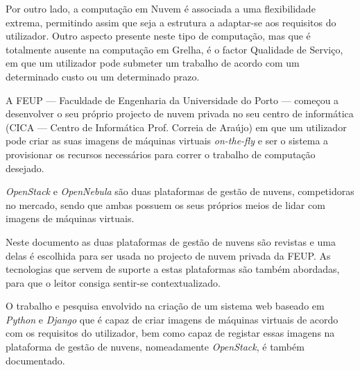 Por outro lado, a computação em Nuvem é associada a uma flexibilidade extrema, permitindo assim que seja a estrutura a adaptar-se aos requisitos do utilizador. Outro aspecto presente neste tipo de computação, mas que é totalmente ausente na computação em Grelha, é o factor Qualidade de Serviço, em que um utilizador pode submeter um trabalho de acordo com um determinado custo ou um determinado prazo.

A FEUP --- Faculdade de Engenharia da Universidade do Porto --- começou a desenvolver o seu próprio projecto de nuvem privada no seu centro de informática (CICA --- Centro de Informática Prof. Correia de Araújo) em que um utilizador pode criar as suas imagens de máquinas virtuais \textit{on-the-fly} e ser o sistema a provisionar os recursos necessários para correr o trabalho de computação desejado.

\textit{OpenStack} e \textit{OpenNebula} são duas plataformas de gestão de nuvens, competidoras no mercado, sendo que ambas possuem os seus próprios meios de lidar com imagens de máquinas virtuais.

Neste documento as duas plataformas de gestão de nuvens são revistas e uma delas é escolhida para ser usada no projecto de nuvem privada da FEUP. As tecnologias que servem de suporte a estas plataformas são também abordadas, para que o leitor consiga sentir-se contextualizado.

O trabalho e pesquisa envolvido na criação de um sistema web baseado em \textit{Python} e \textit{Django} que é capaz de criar imagens de máquinas virtuais de acordo com os requisitos do utilizador, bem como capaz de registar essas imagens na plataforma de gestão de nuvens, nomeadamente \textit{OpenStack}, é também documentado.
